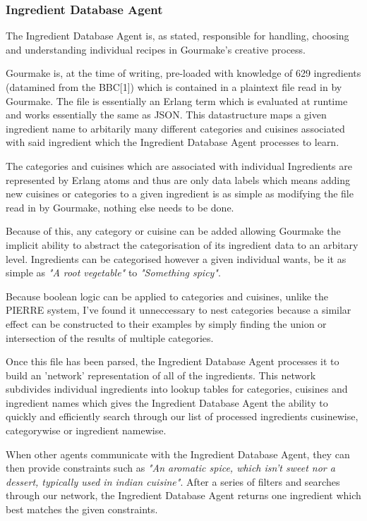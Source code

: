 \documentclass[9pt,titlepage,a4paper]{extarticle}
\begin{document}
\subsubsection{Ingredient Database Agent}
    The Ingredient Database Agent is, as stated, responsible for handling, choosing and understanding individual
    recipes in Gourmake's creative process. 
    
    Gourmake is, at the time of writing, pre-loaded with knowledge of 629 ingredients (datamined from the BBC[1]) which is 
    contained in a plaintext file read in by Gourmake. The file is essentially an Erlang term which is evaluated at 
    runtime and works essentially the same as JSON. This datastructure maps a given ingredient name to arbitarily many different
    categories and cuisines associated with said ingredient which the Ingredient Database Agent processes to
    learn.
    
    The categories and cuisines which are associated with individual Ingredients are represented by Erlang atoms
    and thus are only data labels which means adding new cuisines or categories to a given ingredient is as simple
    as modifying the file read in by Gourmake, nothing else needs to be done.

    Because of this, any category or cuisine can be added allowing Gourmake the implicit ability to abstract the 
    categorisation of its ingredient data to an arbitary level. Ingredients can be categorised however a given individual wants, 
    be it as simple as \textit{"A root vegetable"} to \textit{"Something spicy"}. 

    Because boolean logic can be applied to categories and cuisines, unlike the PIERRE system, I've found it
    unneccessary to nest categories because a similar effect can be constructed to their examples by simply
    finding the union or intersection of the results of multiple categories.

    Once this file has been parsed, the Ingredient Database Agent processes it to build an 'network' representation
    of all of the ingredients. This network subdivides individual ingredients into lookup tables for categories, cuisines 
    and ingredient names which gives the Ingredient Database Agent the ability to quickly and efficiently search through
    our list of processed ingredients cusinewise, categorywise or ingredient namewise.

    When other agents communicate with the Ingredient Database Agent, they can then provide constraints such as
    \textit{"An aromatic spice, which isn't sweet nor a dessert, typically used in indian cuisine"}. After a series of filters
    and searches through our network, the Ingredient Database Agent returns one ingredient which best matches the
    given constraints.
\end{document}
